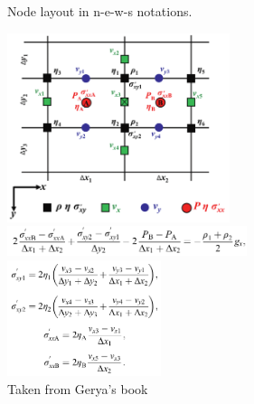 \begin{multicols}{2}


\begin{center}
{\captionfont Node layout in {n-e-w-s} notations.}
\end{center}

\columnbreak
\begin{center}
\includegraphics[width=6.5cm]{images/fdm/gerya_B}\\
\includegraphics[width=7cm]{images/fdm/gerya_D}\\
\includegraphics[width=4.5cm]{images/fdm/gerya_F}\\
{\captionfont Taken from Gerya's book}
\end{center}
\end{multicols}

